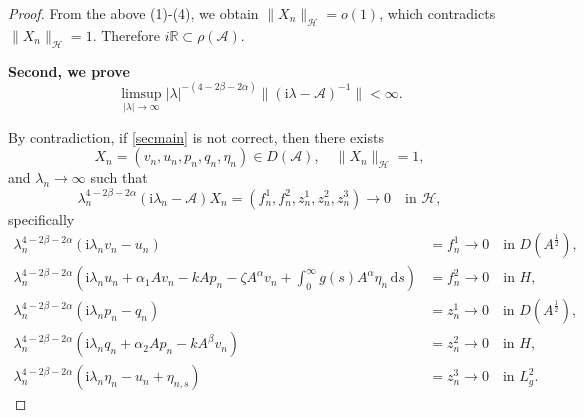 \documentclass[12pt,reqno]{article}
\begin{document}
\begin{proof}
		From the above (1)-(4), we obtain $\|X_n\|_{\mathcal{H}}=o(1) $, which contradicts $\|X_n\|_{\mathcal{H}} = 1$.
		Therefore $i\mathbb{R} \subset \rho(\mathcal{A})$.

{\bf Second, we prove
\begin{equation}\label{secmain}
\limsup_{|\lambda| \to \infty} |\lambda|^{-{(4 - 2\beta - 2\alpha)}} \| (\mathrm{i}\lambda -\mathcal{A})^{-1} \| < \infty.
\end{equation}
}

By contradiction, if \eqref{secmain} is not correct, then there exists
		\[
		X_n = (v_n, u_n, p_n, q_n,\eta_n) \in D(\mathcal{A}),\quad \|X_n\|_\mathcal{H}= 1,
		\]
		and $\lambda_n \to \infty$ such that
		\begin{equation}\label{sj}
			\lambda_n^{4 - 2\beta - 2\alpha} (\mathrm{i}\lambda_n - \mathcal{A})X_n = (f_n^1, f_n^2, z_n^1, z_n^2, z_n^3) \to 0 \quad \text{in } \mathcal{H},
		\end{equation}
	specifically
		\begin{align}
			\lambda_n^{4 - 2\beta - 2\alpha} (\mathrm{i}\lambda_n v_n - u_n) &= f_n^1\to0 \quad \text{in } {D}({A}^{\frac{1}{2}}),\label{sj1} \\
			\lambda_n^{4 - 2\beta - 2\alpha} \left( \mathrm{i}\lambda_n u_n + \alpha_1 A v_n - k A p_n -\zeta A^\alpha v_n+ \int_0^\infty g(s) A^\alpha\eta_n \, \mathrm{d}s \right) &= f_n^2\to0 \quad \text{in } {H}, \label{sj2}\\
			\lambda_n^{4 - 2\beta - 2\alpha} (\mathrm{i}\lambda_n p_n - q_n) &= z_n^1\to0 \quad \text{in } {D}({A}^{\frac{1}{2}}), \label{sj3} \\
			\lambda_n^{4 - 2\beta - 2\alpha} \left( \mathrm{i}\lambda_n q_n + \alpha_2 A p_n - k A^\beta v_n \right) &= z_n^2\to0 \quad \text{in } {H},  \label{sj4}\\
			\lambda_n^{4 - 2\beta - 2\alpha} (\mathrm{i}\lambda_n \eta_n - u_n + \eta_{n,s}) &= z_n^3\to0 \quad \text{in } L_g^2.\label{sj5}
		\end{align}


\end{proof}
\end{document}
